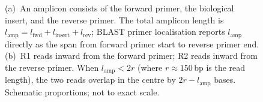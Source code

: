 \begin{figure}[H]
\caption{(a)~An amplicon consists of the forward primer, the biological insert, and the
reverse primer. The total amplicon length is $l_\mathrm{amp} = l_\mathrm{fwd} +
l_\mathrm{insert} + l_\mathrm{rev}$; BLAST primer localisation reports
$l_\mathrm{amp}$ directly as the span from forward primer start to reverse primer end.
(b)~R1 reads inward from the forward primer; R2 reads inward from the reverse primer.
When $l_\mathrm{amp} < 2r$ (where $r \approx 150$\,bp is the read length), the two reads
overlap in the centre by $2r - l_\mathrm{amp}$ bases. Schematic proportions; not to
exact scale.}
\label{fig:amplicon-structure}
\end{figure}

